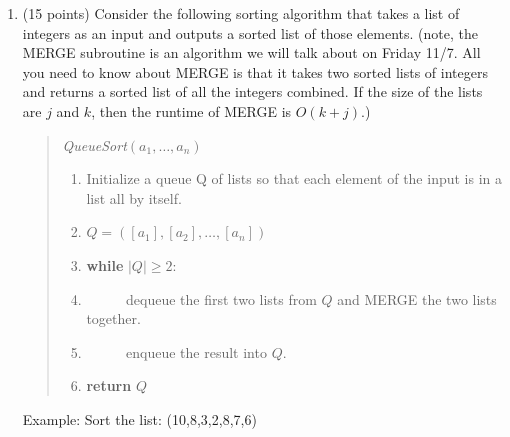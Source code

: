 \documentclass[10pt,letterpaper,unboxed,cm]{article}
\begin{document}
\begin{enumerate}
\begin{enumerate}
\begin{quote}
{\bf return} $0.5625$

\end{quote}

\item
A loop invariant for this algorithm is:
\begin{center}
\emph{After each iteration, $lo\leq r\leq hi$.}
\end{center}

Prove this loop invariant.

\end{enumerate}

\item (15 points)
Consider the following sorting algorithm that takes a list of integers as an input and outputs a sorted list of those elements. (note, the MERGE subroutine is an algorithm we will talk about on Friday 11/7. All you need to know about MERGE is that it takes two sorted lists of integers and returns a sorted list of all the integers combined. If the size of the lists are $j$ and $k$, then the runtime of MERGE is $O(k+j)$.)

\begin{quote}
\emph{QueueSort}$(a_1,\dots,a_n)$
\begin{enumerate}[1.]
\item Initialize a queue Q of lists so that each element of the input is in a list all by itself.
\item $Q = ([a_1],[a_2],\dots,[a_n])$
\item {\bf while} $|Q|\geq 2$:
\item ~~~~~ dequeue the first two lists from $Q$ and MERGE the two lists together.
\item ~~~~~ enqueue the result into $Q$.
\item {\bf return} $Q$
\end{enumerate}
\end{quote}
\newpage

Example: Sort the list: (10,8,3,2,8,7,6)


\end{enumerate}
\end{document}
